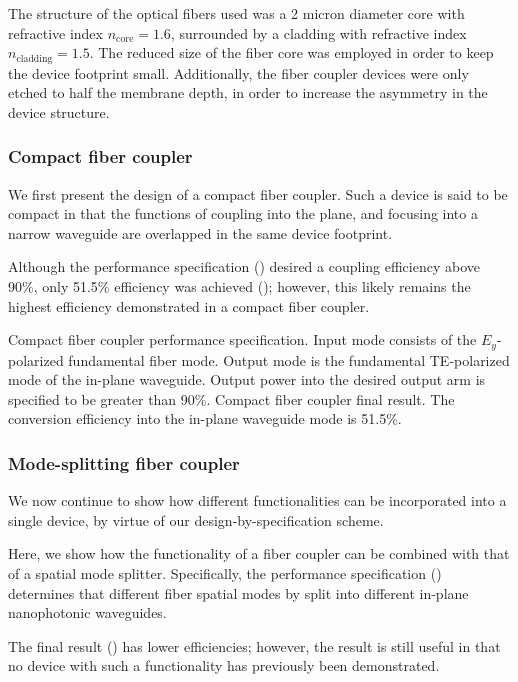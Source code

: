 \documentclass[letterpaper,10pt]{article}
\begin{document}
The structure of the optical fibers used was a 2 micron diameter core with 
    refractive index $n_\text{core} = 1.6$,
    surrounded by a cladding with refractive index $n_\text{cladding}=1.5$.
The reduced size of the fiber core was employed in order
    to keep the device footprint small.
Additionally, the fiber coupler devices were only etched to half the membrane depth,
    in order to increase the asymmetry in the device structure.

\subsubsection{Compact fiber coupler}
We first present the design of a compact fiber coupler.
Such a device is said to be compact in that the functions
    of coupling into the plane, and focusing into a narrow waveguide
    are overlapped in the same device footprint.

Although the performance specification ()
    desired a coupling efficiency above 90\%,
    only 51.5\% efficiency was achieved ();
    however, this likely remains the highest efficiency demonstrated
    in a compact fiber coupler.

    {Compact fiber coupler performance specification.
    Input mode consists of the $E_y$-polarized fundamental fiber mode.
    Output mode is the fundamental TE-polarized mode of the in-plane waveguide.
    Output power into the desired output arm is specified to be greater than 90\%.}
    {Compact fiber coupler final result.
    The conversion efficiency into the in-plane waveguide mode is 51.5\%.}

\subsubsection{Mode-splitting fiber coupler}
We now continue to show how different functionalities
    can be incorporated into a single device,
    by virtue of our design-by-specification scheme.

Here, we show how the functionality of a fiber coupler
    can be combined with that of a spatial mode splitter.
Specifically, the performance specification ()
    determines that different fiber spatial modes
    by split into different in-plane nanophotonic waveguides.

The final result () has lower efficiencies;
    however, the result is still useful 
    in that no device with such a functionality has previously been demonstrated.
\end{document}
